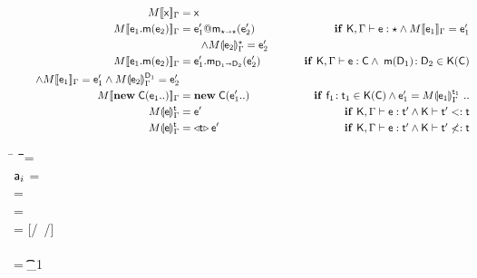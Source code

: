 \documentclass[sigconf]{acmart}
\begin{document}
\begin{figure*}[!h]
\begin{mathpar}


\end{mathpar}

\begin{minipage}{0.32\textwidth}
\begin{align*}
\TRG[M]{\x}\Env &= \x & \\
\TRG[M]{\Call{\e_1}\m{{\e_2}}}\Env &= \DynCall{\ep_1}\m{\ep_2} & \tag*{\IF\EM{\TypeCk{\K,\Env}\e\any
\AND \TRG[M]{\e_1}\Env = \ep_1}} \\ &\tag*{\EM{\wedge \TAG[M]{\e_2}\Env{\any} = \ep_2}}\\
\TRG[M]{\Call{\e_1}\m{{\e_2}}}\Env &= \KCall{\ep_1}\m{\ep_2}{\D[1]}{\D[2]} & \tag*{\IF\EM{\TypeCk{\K,\Env}\e\C
\AND\; \Mtype\m{\D[1]}{\D[2]}\In\App\K\C}}\\
\tag*{\EM{\AND \TRG[M]{\e_1}\Env = \ep_1 \wedge \TAG[M]{\e_2}\Env{\D[1]} = \ep_2}}\\
\TRG[M]{\New\C{{\e_1}..}}\Env &= \New\C{\ep_1..} & \tag*{\IF\EM{\Ftype{\f[1]}{\t[1]}\In\App\K\C
    \AND \ep[1] = \TAG[M]{\e[1]}\Env{\t[1]} ~..}}\\
\TAG[M]{\e}{\Env}\t &= \e' & \tag*{\IF\EM{\TypeCk{\K,\Env}\e\tp \AND \K\vdash\tp\Sub\t}}\\
\TAG[M]{\e}{\Env}\t &= \MonCast{\t}{\ep} & \tag*{\IF\EM{\TypeCk{\K,\Env}\e\tp \AND \K\vdash\tp\not\Sub\t}}
\end{align*}
\end{minipage}\hspace{1cm}
\begin{minipage}{0.45\textwidth}
\begin{tabbing}
  \K\HS \New{} \HS\= \s~ \HS \=\Red\HS \= \K \HS\= \ap \HS\= \sp\HS \= \WHERE\HS\= \fresh\ap \HS\HS\HS\HS\HS\HS\HS\=  \sp = {\Map{}}
\\
\K\HS \FReadR\a{\f[i]} \> \s           \>\Red\>     \K \>$\a[i]$ \> \s  \> \WHERE \>\App\s\a=\obj{}
\\
\K\HS {\FWriteR\a{\f[i]}\ap} \> \s     \>\Red\>     \K \> \ap \> \sp \>  \WHERE \>\App\s\a=\obj{} \HS  
\\ \> \> \> \> \> \> \> \sp = \Map{}
\\
\K\HS{\KCall\a\m\ap\t\tp} \> \s      \>\Red\>     \K \>  \ep \> \s \> \WHERE\> \ep = {[\a/\this~{\ap/\x}]\e} \HS \\ \> \> \> \> \> \> \> \Mdef\m{}\e\In \App\K\C  \\ \> \> \> \> \> \> \>  \App\s\a=\obj{} \> \StrSub {\emptyset}\K\t {\t_{1}} \\ 

\end{tabbing}
\end{minipage}
\end{figure*}
\end{document}
